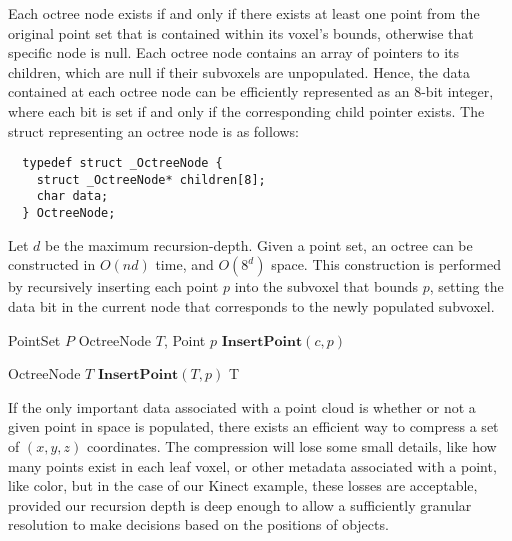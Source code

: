 \documentclass[twoside,twocolumn]{article}
\begin{document}
Each octree node exists if and only if there exists at least one point from the original point set
that is contained within its voxel's bounds, otherwise that specific node is null. Each octree node contains
an array of pointers to its children, which are null if their subvoxels are unpopulated. Hence, the data
contained at each octree node can be efficiently represented as an 8-bit integer, where each bit is set if
and only if the corresponding child pointer exists. The struct representing an octree node is as follows:

\begin{lstlisting}
  typedef struct _OctreeNode {
    struct _OctreeNode* children[8];
    char data;
  } OctreeNode;
\end{lstlisting}

Let $d$ be the maximum recursion-depth. Given a point set, an octree can be constructed in
$O(nd)$ time, and $O(8^d)$ space. This construction is performed by recursively inserting each point $p$
into the subvoxel that bounds $p$, setting the data bit in the current node that corresponds to the
newly populated subvoxel.

\begin{algorithm}[h]
\small
\caption{Create an octree by recursively inserting each point, creating nodes and setting bits as necessary}
\label{alg:CreateOctree}
\begin{algorithmic}[1]
 {PointSet $P$}
   {OctreeNode $T$, Point $p$}
      \State $\mathbf{InsertPoint}(c, p)$
    \EndIf
  \EndProcedure

  \State OctreeNode $T$
    \State $\mathbf{InsertPoint}(T, p)$
  \EndFor
  \State \Return T
\EndProcedure
\Statex
\end{algorithmic}
  \vspace{-0.4cm}
\end{algorithm}

If the only important data associated with a point cloud is whether or not a given point in space is
populated, there exists an efficient way to compress a set of $(x,y,z)$ coordinates. The compression
will lose some small details, like how many points exist in each leaf voxel, or other metadata
associated with a point, like color, but in the case of our Kinect example, these losses are acceptable,
provided our recursion depth is deep enough to allow a sufficiently granular resolution to make decisions
based on the positions of objects.
\end{document}

